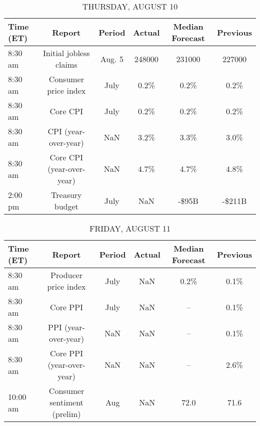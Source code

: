 \documentclass{article}%
\begin{document}
%


\begin{table}[htbp]%
\caption{THURSDAY, AUGUST 10}%
\centering%
\begin{adjustbox}{width=1\textwidth}%
\begin{tabular}{lccccc}
\toprule
Time (ET) &                    Report & Period & Actual & Median Forecast & Previous \\
\midrule
  8:30 am &    Initial jobless claims & Aug. 5 & 248000 &          231000 &   227000 \\
  8:30 am &      Consumer price index &   July &   0.2\% &            0.2\% &     0.2\% \\
  8:30 am &                  Core CPI &   July &   0.2\% &            0.2\% &     0.2\% \\
  8:30 am &      CPI (year-over-year) &    NaN &   3.2\% &            3.3\% &     3.0\% \\
  8:30 am & Core CPI (year-over-year) &    NaN &   4.7\% &            4.7\% &     4.8\% \\
  2:00 pm &           Treasury budget &   July &    NaN &           -\$95B &   -\$211B \\
\bottomrule
\end{tabular}
%
\end{adjustbox}%
\end{table}

%


\begin{table}[htbp]%
\caption{FRIDAY, AUGUST 11}%
\centering%
\begin{adjustbox}{width=1\textwidth}%
\begin{tabular}{lccccc}
\toprule
Time (ET) &                      Report & Period & Actual & Median Forecast & Previous \\
\midrule
  8:30 am &        Producer price index &   July &    NaN &            0.2\% &     0.1\% \\
  8:30 am &                    Core PPI &   July &    NaN &              -- &     0.1\% \\
  8:30 am &        PPI (year-over-year) &    NaN &    NaN &              -- &     0.1\% \\
  8:30 am &   Core PPI (year-over-year) &    NaN &    NaN &              -- &     2.6\% \\
 10:00 am & Consumer sentiment (prelim) &    Aug &    NaN &            72.0 &     71.6 \\
\bottomrule
\end{tabular}
%
\end{adjustbox}%
\end{table}
\end{document}
